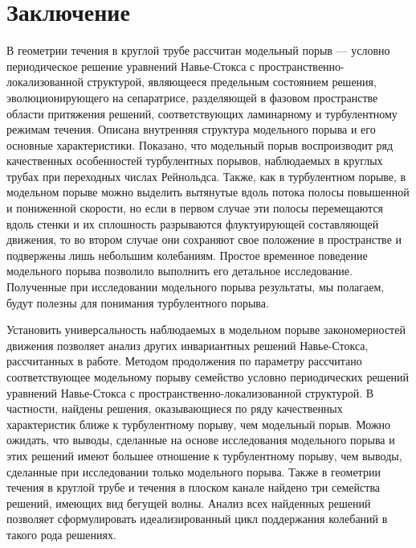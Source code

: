\chapter*{Заключение} 


В геометрии течения в круглой трубе рассчитан модельный порыв --- условно периодическое решение уравнений Навье-Стокса с пространственно-локализованной структурой, являющееся предельным состоянием решения, эволюционирующего на сепаратрисе, разделяющей в фазовом пространстве области притяжения решений, соответствующих ламинарному и турбулентному режимам течения. Описана внутренняя структура модельного порыва и его основные характеристики. Показано, что модельный порыв воспроизводит ряд качественных особенностей турбулентных порывов, наблюдаемых в круглых трубах при переходных числах Рейнольдса. Также, как в турбулентном порыве, в модельном порыве можно выделить вытянутые вдоль потока полосы повышенной и пониженной скорости, но если в первом случае эти полосы перемещаются вдоль стенки и их сплошность разрываются флуктуирующей составляющей движения, то во втором случае они сохраняют свое положение в пространстве и подвержены лишь небольшим колебаниям. Простое временное поведение модельного порыва позволило выполнить его детальное исследование. Полученные при исследовании модельного порыва результаты, мы полагаем, будут полезны для понимания турбулентного порыва. 

Установить универсальность наблюдаемых в модельном порыве закономерностей движения позволяет анализ других инвариантных решений Навье-Стокса, рассчитанных в работе. Методом продолжения по параметру рассчитано соответствующее модельному порыву семейство условно периодических решений уравнений Навье-Стокса с пространственно-локализованной структурой. В частности, найдены решения, оказывающиеся по ряду качественных характеристик ближе к турбулентному порыву, чем модельный порыв. Можно ожидать, что выводы, сделанные на основе исследования модельного порыва и этих решений имеют большее отношение к турбулентному порыву, чем выводы, сделанные при исследовании только модельного порыва. Также в геометрии течения в круглой трубе и течения в плоском канале найдено три семейства решений, имеющих вид бегущей волны. Анализ всех найденных решений позволяет сформулировать идеализированный цикл поддержания колебаний в такого рода решениях. 

